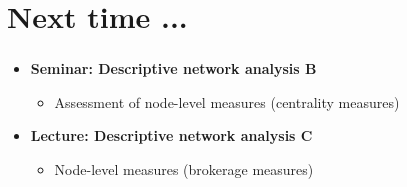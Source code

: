 \documentclass[8pt]{beamer}
\begin{document}



\bgroup
{}
\begin{frame}[plain]{}
\begin{center}
\color{white}{\Huge Questions}
\end{center}
\end{frame}
\egroup
  





\section*{Next time ...}


\bgroup
{}
\begin{frame}[plain]{}
\begin{center}
\color{white}{\Huge\insertsection}
\end{center}
\end{frame}
\egroup


\begin{frame}
\frametitle{\insertsection}

\begin{itemize}

\item 	\textbf{Seminar: Descriptive network analysis B}
	\begin{itemize}
	\item Assessment of node-level measures (centrality measures)
	\end{itemize}
	

\medskip
\medskip

\item 	\textbf{Lecture: Descriptive network analysis C}
	\begin{itemize}
	\item Node-level measures (brokerage measures)
	\end{itemize}

	

		
\end{itemize}

\end{frame}
\end{document}
